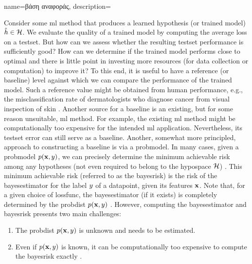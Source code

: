 {name={\foreignlanguage{greek}{βάση αναφοράς}},
    description={Consider some \gls{ml} method that produces a learned 
    	\gls{hypothesis} (or trained \gls{model}) $\hat{h} \in \mathcal{H}$. We evaluate the quality of a trained \gls{model} 
    	by computing the average \gls{loss} on a \gls{testset}. But how can we assess 
    	whether the resulting \gls{testset} performance is sufficiently good? How can we 
    	determine if the trained \gls{model} performs close to optimal and there is little point 
    	in investing more resources (for \gls{data} collection or computation) to improve it? 
    	To this end, it is useful to have a reference (or baseline) level against which 
    	we can compare the performance of the trained \gls{model}. Such a reference value 
    	might be obtained from human performance, e.g., the misclassification rate of dermatologists 
   	who diagnose cancer from visual inspection of skin \cite{SkinHumanAI}. Another source for a baseline is an existing, 
    	but for some reason unsuitable, \gls{ml} method. For example, the existing \gls{ml} method 
    	might be computationally too expensive for the intended \gls{ml} application. 
    	Nevertheless, its \gls{testset} error can still serve as a baseline. Another, somewhat more principled, 
    	approach to constructing a baseline is via a \gls{probmodel}. In many cases, given a \gls{probmodel} $p({\bf x},y)$,  
    	we can precisely determine the \gls{minimum} achievable \gls{risk} among any hypotheses
    	(not even required to belong to the \gls{hypospace} $\mathcal{H}$) \cite{LC}. 
    	This \gls{minimum} achievable \gls{risk} (referred to as the \gls{bayesrisk}) is the \gls{risk} 
    	of the \gls{bayesestimator} for the \gls{label} $y$ of a \gls{datapoint}, given
    	its \gls{feature}s ${\bf x}$. Note that, for a given choice of \gls{lossfunc}, the 
    	\gls{bayesestimator} (if it exists) is completely determined by the \gls{probdist} $p({\bf x},y)$ \cite[Ch. 4]{LC}. 
    	However, computing the \gls{bayesestimator} and \gls{bayesrisk} presents two 
    	main challenges:
    	\begin{enumerate}[label=\arabic*)]
    		\item The \gls{probdist} $p({\bf x},y)$ is unknown and needs to be estimated.
    		\item Even if $p({\bf x},y)$ is known, it can be computationally too expensive to compute the \gls{bayesrisk} exactly \cite{cooper1990computational}. 

\end{enumerate}}}
